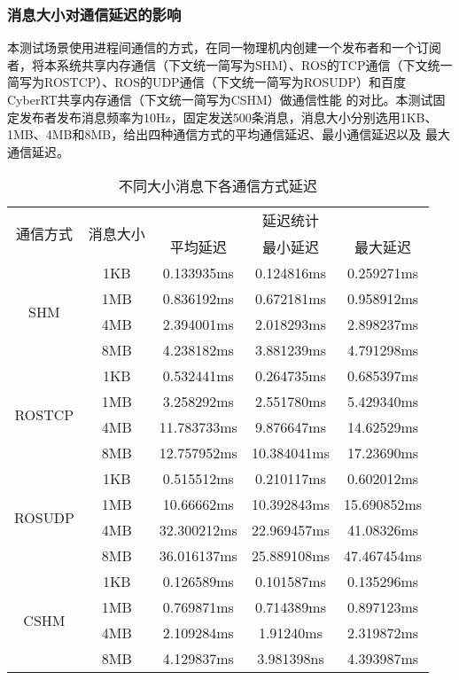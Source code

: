 \subsubsection{消息大小对通信延迟的影响}
本测试场景使用进程间通信的方式，在同一物理机内创建一个发布者和一个订阅者，将本系统共享内存通信（下文统一简写为SHM）、ROS的TCP通信（下文统一简写为ROSTCP）、ROS的UDP通信（下文统一简写为ROSUDP）和百度CyberRT共享内存通信（下文统一简写为CSHM）做通信性能
的对比。本测试固定发布者发布消息频率为10Hz，固定发送500条消息，消息大小分别选用1KB、1MB、4MB和8MB，给出四种通信方式的平均通信延迟、最小通信延迟以及
最大通信延迟。
\begin{table}[htb]
  \centering\small
  \caption{不同大小消息下各通信方式延迟}
  \renewcommand\arraystretch{1.2}
  \label{one_to_one}
  \begin{tabular}{ccccc}
    \toprule
    \multirow{2}{*}{通信方式} & \multirow{2}{*}{消息大小} & \multicolumn{3}{c}{延迟统计}\\
    \cline{3-5}
     & & 平均延迟 & 最小延迟 & 最大延迟\\
    \midrule
    \multirow{4}{*}{SHM} & 1KB& 0.133935ms& 0.124816ms& 0.259271ms\\ & 1MB & 0.836192ms & 0.672181ms & 0.958912ms \\ & 4MB & 2.394001ms & 2.018293ms & 2.898237ms \\ & 8MB & 4.238182ms & 3.881239ms & 4.791298ms\\
    \hline
    \multirow{4}{*}{ROSTCP} & 1KB& 0.532441ms& 0.264735ms& 0.685397ms\\ & 1MB & 3.258292ms & 2.551780ms & 5.429340ms \\ & 4MB & 11.783733ms & 9.876647ms & 14.62529ms \\ & 8MB & 12.757952ms & 10.384041ms & 17.23690ms\\
    \hline
    \multirow{4}{*}{ROSUDP} & 1KB& 0.515512ms& 0.210117ms& 0.602012ms\\ & 1MB & 10.66662ms & 10.392843ms & 15.690852ms \\ & 4MB & 32.300212ms & 22.969457ms & 41.08326ms \\ & 8MB & 36.016137ms & 25.889108ms & 47.467454ms\\
    \hline
    \multirow{4}{*}{CSHM} & 1KB& 0.126589ms& 0.101587ms& 0.135296ms\\ & 1MB & 0.769871ms & 0.714389ms & 0.897123ms \\ & 4MB & 2.109284ms & 1.91240ms & 2.319872ms \\ & 8MB & 4.129837ms & 3.981398ns & 4.393987ms\\
    \bottomrule
  \end{tabular}
\end{table}

